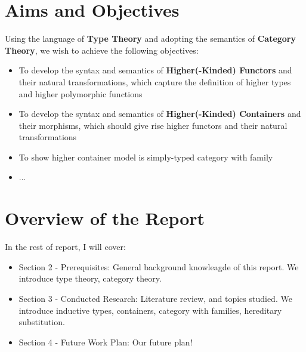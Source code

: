 \section{Aims and Objectives}

Using the language of \textbf{Type Theory} and adopting the semantics of \textbf{Category Theory}, we wish to achieve the following objectives:

\begin{itemize}
  \item{To develop the syntax and semantics of \textbf{Higher(-Kinded) Functors} and their natural transformations, which capture the definition of higher types and higher polymorphic functions}
  \item{To develop the syntax and semantics of \textbf{Higher(-Kinded) Containers} and their morphisms, which should give rise higher functors and their natural transformations}
  \item{To show higher container model is simply-typed category with family}
  \item{...}
\end{itemize}

\section{Overview of the Report}

In the rest of report, I will cover:
\begin{itemize}
  \item{Section 2 - Prerequisites: General background knowleagde of this report. We introduce type theory, category theory.}
  \item{Section 3 - Conducted Research: Literature review, and topics studied. We introduce inductive types, containers, category with families, hereditary substitution.}
  \item{Section 4 - Future Work Plan: Our future plan!}
\end{itemize}

